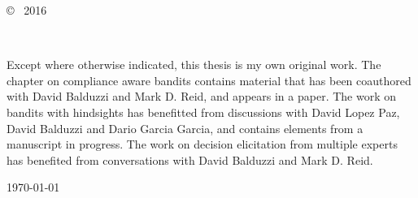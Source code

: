 \vspace*{14cm}
\begin{center}
  \makeatletter
  \copyright\ \@author{} 2016
  \makeatother
\end{center}
\noindent
\begin{center}
  \footnotesize{~} %
\end{center}
\noindent

\newpage

\vspace*{7cm}
\begin{center}
  Except where otherwise indicated, this thesis is my own original
  work. The chapter on compliance aware bandits contains material that has been coauthored with David Balduzzi and Mark D. Reid, and appears in a paper. The work on bandits with hindsights has benefitted from discussions with David Lopez Paz, David Balduzzi and Dario Garcia Garcia, and contains elements from a manuscript in progress. The work on decision elicitation from multiple experts has benefited from conversations with David Balduzzi and Mark D. Reid.  

\end{center}

\vspace*{4cm}

\hspace{8cm}\makeatletter\@author\makeatother\par
\hspace{8cm}\today
